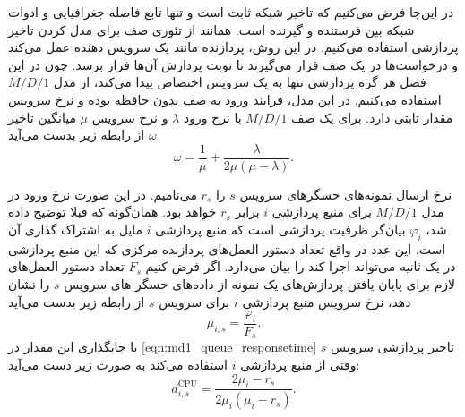     در این‌جا فرض می‌کنیم که تاخیر شبکه ثابت است و تنها تابع فاصله جغرافیایی و ادوات شبکه بین فرستنده و گیرنده است.
    همانند \cite{optimial_price_cloud_valerio} از تئوری صف برای مدل کردن تاخیر پردازشی استفاده می‌کنیم.
    در این روش، پردازنده مانند یک سرویس دهنده عمل می‌کند و درخواست‌ها در یک صف قرار می‌گیرند تا نوبت پردازش آن‌ها فرار برسد.
    چون در این فصل هر گره پردازشی تنها به یک سرویس اختصاص پیدا می‌کند، از مدل $M/D/1$ استفاده می‌کنیم.
    در این مدل، فرایند ورود به صف بدون حافظه بوده و نرخ سرویس‌ مقدار ثابتی دارد.
    برای یک صف $M/D/1$ با نرخ ورود $\lambda$ و نرخ سرویس  $\mu$ میانگین تاخیر $\omega$ از رابطه زیر بدست می‌آید\cite{basic_queueing_sztrik}
    \begin{equation}\label{eqn:md1_queue_responsetime}
      \omega = \frac{1}{\mu} + \frac{\lambda}{2\mu(\mu-\lambda)}.
    \end{equation}
    
    نرخ ارسال نمونه‌های حسگر‌های سرویس $s$ را $r_s$ می‌نامیم.
    در این صورت نرخ ورود در مدل $M/D/1$ برای منبع پردازشی $i$ برابر $r_s$ خواهد بود.
    همان‌گونه که قبلا توضیح داده شد، $\varphi_i$ بیان‌گر ظرفیت پردازشی است که منبع پردازشی $i$ مایل به اشتراک گذاری آن است.
    این عدد در واقع تعداد دستور العمل‌های پردازنده مرکزی که این منبع پردازشی در یک ثانیه می‌تواند اجرا کند را بیان می‌دارد.
    اگر فرض کنیم $F_s$ تعداد دستور العمل‌های لازم برای پایان یافتن پردازش‌های یک نمونه از داده‌های حسگر های سرویس‌ $s$ را نشان دهد، نرخ سرویس منبع پردازشی $i$ برای سرویس $s$ از رابطه زیر بدست می‌آید
    \begin{equation}
      \mu_{i,s} = \frac{\varphi_i}{F_s}.
    \end{equation}
    با جایگذاری این مقدار در \cref{eqn:md1_queue_responsetime} تاخیر پردازشی سرویس $s$ وقتی از منبع پردازشی $i$ استفاده می‌کند به صورت زیر دست می‌آید:
    \begin{equation}
      d_{i,s}^{\text{CPU}} = \frac{2\mu_i-r_s}{2\mu_i(\mu_i-r_s)}.
    \end{equation}

